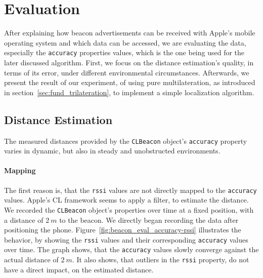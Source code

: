 

\section{Evaluation}\label{sec:beacon_eval}
After explaining how beacon advertisements can be received with Apple's mobile operating system and which data can be accessed, we are evaluating the data, especially the \texttt{accuracy} properties values, which is the one being used for the later discussed algorithm. First, we focus on the distance estimation's quality, in terms of its error, under different environmental circumstances. Afterwards, we present the result of our experiment, of using pure multilateration, as introduced in section~\ref{sec:fund_trilateration}, to implement a simple localization algorithm.

\subsection{Distance Estimation}

The measured distances provided by the \texttt{CLBeacon} object's \texttt{accuracy} property varies in dynamic, but also in steady and unobstructed environments.

\paragraph{Mapping} The first reason is, that the \texttt{rssi} values are not directly mapped to the \texttt{accuracy} values. Apple's \ac{CL} framework seems to apply a filter, to estimate the distance. We recorded the \texttt{CLBeacon} object's properties over time at a fixed position, with a distance of $2~m$ to the beacon. We directly began recording the data after positioning the phone. Figure~\ref{fig:beacon_eval_accuracy-rssi} illustrates the behavior, by showing the \texttt{rssi} values and their corresponding \texttt{accuracy} values over time. The graph shows, that the \texttt{accuracy} values slowly converge against the actual distance of $2~m$. It also shows, that outliers in the \texttt{rssi} property, do not have a direct impact, on the estimated distance.


